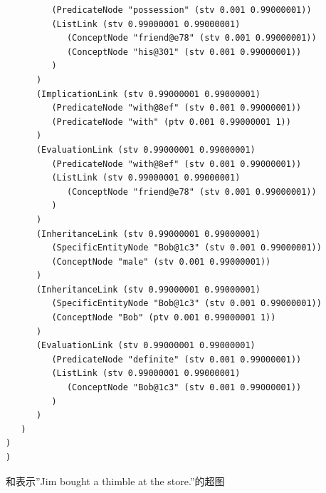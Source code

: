 {\begin{tiny}
\begin{lstlisting}
         (PredicateNode "possession" (stv 0.001 0.99000001))
         (ListLink (stv 0.99000001 0.99000001)
            (ConceptNode "friend@e78" (stv 0.001 0.99000001))
            (ConceptNode "his@301" (stv 0.001 0.99000001))
         )
      )
      (ImplicationLink (stv 0.99000001 0.99000001)
         (PredicateNode "with@8ef" (stv 0.001 0.99000001))
         (PredicateNode "with" (ptv 0.001 0.99000001 1))
      )
      (EvaluationLink (stv 0.99000001 0.99000001)
         (PredicateNode "with@8ef" (stv 0.001 0.99000001))
         (ListLink (stv 0.99000001 0.99000001)
            (ConceptNode "friend@e78" (stv 0.001 0.99000001))
         )
      )
      (InheritanceLink (stv 0.99000001 0.99000001)
         (SpecificEntityNode "Bob@1c3" (stv 0.001 0.99000001))
         (ConceptNode "male" (stv 0.001 0.99000001))
      )
      (InheritanceLink (stv 0.99000001 0.99000001)
         (SpecificEntityNode "Bob@1c3" (stv 0.001 0.99000001))
         (ConceptNode "Bob" (ptv 0.001 0.99000001 1))
      )
      (EvaluationLink (stv 0.99000001 0.99000001)
         (PredicateNode "definite" (stv 0.001 0.99000001))
         (ListLink (stv 0.99000001 0.99000001)
            (ConceptNode "Bob@1c3" (stv 0.001 0.99000001))
         )
      )
   )
)
)

\end{lstlisting}\end{tiny}}

和表示”Jim bought a thimble at the store.”的超图

